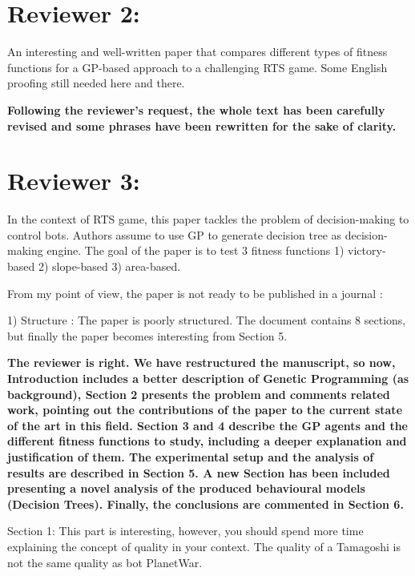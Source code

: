 \documentclass{article}
\begin{document}
\section{Reviewer 2:}
An interesting and well-written paper that compares different types of fitness functions for a GP-based approach to a challenging RTS game.
Some English proofing still needed here and there.

\vspace{0.5cm} \textbf{Following the reviewer's request, the whole text has been carefully revised and some phrases have been rewritten for the sake of clarity.} \vspace{0.5cm}




\section{Reviewer 3:}

In the context of RTS game, this paper tackles the problem of decision-making to control bots.
Authors assume to use GP to generate decision tree as decision-making engine.
The goal of the paper is to test 3 fitness functions 1) victory-based 2) slope-based 3) area-based.

From my point of view, the paper is not ready to be published in a journal :

1) Structure :
The paper is poorly structured.
The document contains 8 sections, but finally the paper becomes interesting from Section 5.

\vspace{0.5cm} \textbf{The reviewer is right. We have restructured the manuscript, so now, Introduction includes a better description of Genetic Programming (as background), Section 2 presents the problem and comments related work, pointing out the contributions of the paper to the current state of the art in this field. Section 3 and 4 describe the GP agents and the different fitness functions to study, including a deeper explanation and justification of them. The experimental setup and the analysis of results are described in Section 5. A new Section has been included presenting a novel analysis of the produced behavioural models (Decision Trees). Finally, the conclusions are commented in Section 6.} \vspace{0.5cm}


Section 1: This part is interesting, however, you should spend more time explaining the concept of quality in your context. The quality of a Tamagoshi is not the same quality as bot PlanetWar.
\end{document}
